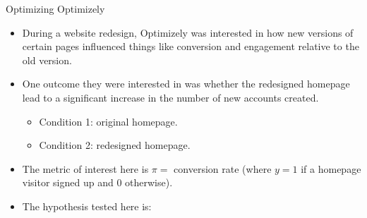 \begin{Example}{Optimizing Optimizely}{}
      \begin{itemize}
            \item During a website redesign, Optimizely was interested in how new versions
                  of certain pages influenced things like conversion and engagement relative to the old version.
            \item One outcome they were interested in was whether the redesigned homepage lead to
                  a significant increase in the number of new accounts created.
                  \begin{itemize}
                        \item Condition 1: original homepage.
                        \item Condition 2: redesigned homepage.
                  \end{itemize}
            \item The metric of interest here is $ \pi= $ conversion rate (where $ y=1 $ if a homepage
                  visitor signed up and $ 0 $ otherwise).
            \item The hypothesis tested here is:


\end{itemize}
\end{Example}
